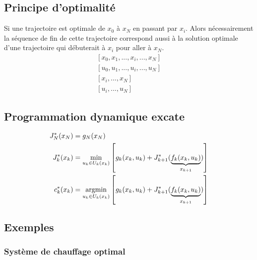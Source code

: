 \subsection{Principe d'optimalité}

Si une trajectoire est optimale de $x_0$ à $x_N$ en passant par $x_i$. Alors nécessairement la séquence de fin de cette trajectoire correspond aussi à la solution optimale d'une trajectoire qui débuterait à $x_i$ pour aller à $x_N$.
\begin{align}
\left[ x_0 , x_1 , ... , x_i , ... , x_N \right] \\
\left[ u_0 , u_1 , ... , u_i , ... , u_N \right] \\
\left[  x_i , ... , x_N \right] \\
\left[  u_i , ... , u_N \right]
\end{align}



\subsection{Programmation dynamique excate}




\begin{align}
J^*_N(x_N) &= g_N(x_N) \\
J^*_k(x_k) &= 
\operatornamewithlimits{min}\limits_{u_k \in U_k(x_k)}
\left[
g_k(x_k , u_k ) + J^*_{k+1}( 
\underbrace{
f_k(x_k , u_k ) 
}_{x_{k+1}}
)
\right] \\
c^*_k(x_k) &= 
\operatornamewithlimits{argmin}\limits_{u_k\in U_k(x_k)}
\left[
g_k(x_k , u_k ) + J^*_{k+1}( 
\underbrace{
f_k(x_k , u_k ) 
}_{x_{k+1}}
)
\right] 
\label{eq:exactdp}
\end{align} 


\subsection{Exemples}

\subsubsection{Système de chauffage optimal}

